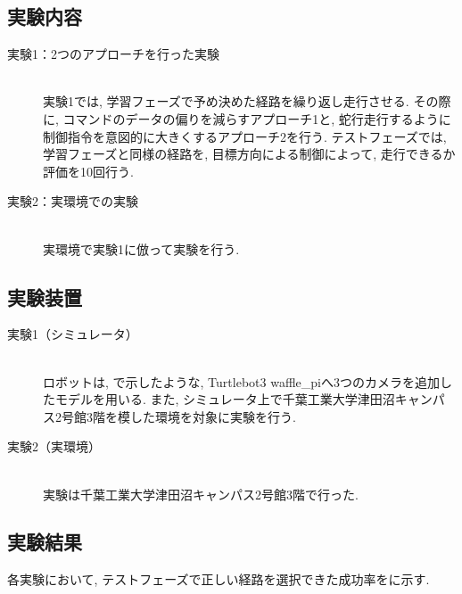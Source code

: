 \documentclass[10pt]{jarticle}
\begin{document}
    \subsection{実験内容}

    
    \begin{description}
        \item[実験1：2つのアプローチを行った実験]\mbox{}\\
        実験1では, 学習フェーズで予め決めた経路を繰り返し走行させる. その際に, コマンドのデータの偏りを減らすアプローチ1と, 蛇行走行するように制御指令を意図的に大きくするアプローチ2を行う. テストフェーズでは, 学習フェーズと同様の経路を, 目標方向による制御によって, 走行できるか評価を10回行う.
        \vspace{-10pt}
        \item[実験2：実環境での実験]\mbox{}\\
        実環境で実験1に倣って実験を行う.  
    \end{description}

    \subsection{実験装置}

    \begin{description}
        \item[実験1（シミュレータ）]\mbox{}\\
        ロボットは, で示したような, Turtlebot3 waffle\_piへ3つのカメラを追加したモデルを用いる. また, シミュレータ上で千葉工業大学津田沼キャンパス2号館3階を模した環境を対象に実験を行う.
        \vspace{-10pt}
        \item[実験2（実環境）]\mbox{}\\
        実験は千葉工業大学津田沼キャンパス2号館3階で行った.
    \end{description}

    \subsection{実験結果}    
    各実験において, テストフェーズで正しい経路を選択できた成功率をに示す. 
    
\end{document}
